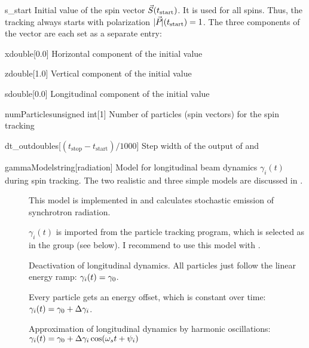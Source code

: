 \documentclass[a4paper]{scrartcl}
\begin{document}
\begin{configdocgroup}{s_start}
  Initial value of the spin vector $\vec{S}_{}(t_\text{start})$. It is used for all spins.
  Thus, the tracking always starts with polarization $|\vec{P}_{}|(t_\text{start}) = 1$. The
  three components of the vector are each set as a separate entry:
  
  \begin{configdoc}{x}{double}{}[0.0]
    Horizontal component \sx of the initial value
  \end{configdoc}

  \begin{configdoc}{z}{double}{}[1.0]
    Vertical component \sz of the initial value
  \end{configdoc}

  \begin{configdoc}{s}{double}{}[0.0]
    Longitudinal component \slong of the initial value
  \end{configdoc}
\end{configdocgroup}

\begin{configdoc}{numParticles}{unsigned int}{}[1]
  Number of particles (spin vectors) for the spin tracking
\end{configdoc}

\begin{configdoc}{dt_out}{double}{\si{\s}}[$(t_\text{stop}-t_\text{start})/1000$]
  Step width of the output of \pvec and \svec[i]
\end{configdoc}

\begin{configdoc}{gammaModel}{string}{}[radiation]
  Model for longitudinal beam dynamics $\gamma_i(t)$ during spin tracking. The two
  realistic and three simple models are discussed in \cite[chapter~4]{dr}.
  \begin{description}
  \item[] This model is implemented in \polem and calculates
    stochastic emission of synchrotron radiation.
  \item[] $\gamma_i(t)$ is imported from the particle tracking program,
    which is selected as  in the group  (see below).
    I recommend to use this model with \ele.
  \item[] Deactivation of longitudinal dynamics. All particles just
    follow the linear energy ramp: $\gamma_i(t) = \gamma_0$.
  \item[] Every particle gets an energy offset, which is constant over
    time: $\gamma_i(t) = \gamma_0 + \Delta\gamma_i$.
  \item[] Approximation of longitudinal dynamics by harmonic
    oscillations:\\$\gamma_i(t) = \gamma_0 + \Delta\gamma_i \cos(\omega_s t + \psi_i)$
  \end{description}
\end{configdoc}
\end{document}
